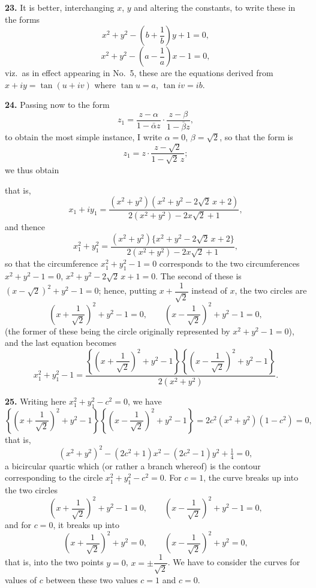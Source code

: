 \documentclass[11pt,a4paper]{article}
\begin{document}
\textbf{23.} It is better, interchanging $x$, $y$ and altering the constants, to write these in the forms
\[
x^2 + y^2 - \left(b + \frac{1}{b}\right) y + 1 = 0,
\]
\[
x^2 + y^2 - \left(a - \frac{1}{a}\right) x - 1 = 0,
\]
viz.\ as in effect appearing in No.~5, these are the equations derived from $x + iy = \tan(u + iv)$ where $\tan u = a$, $\tan iv = ib$.

\textbf{24.} Passing now to the form
\[
z_1 = \frac{z - \alpha}{1 - \bar{\alpha}z} \cdot \frac{z - \beta}{1 - \bar{\beta}z},
\]
to obtain the most simple instance, I write $\alpha = 0$, $\beta = \sqrt{2}$, so that the form is
\[
z_1 = z \cdot \frac{z - \sqrt{2}}{1 - \sqrt{2}\,z};
\]
we thus obtain

that is,
\[
x_1 + i y_1 = \frac{(x^2 + y^2)(x^2 + y^2 - 2\sqrt{2}\,x + 2)}{2(x^2 + y^2) - 2x\sqrt{2} + 1},
\]
and thence
\[
x_1^2 + y_1^2 = \frac{(x^2 + y^2)\{x^2 + y^2 - 2\sqrt{2}\,x + 2\}}{2(x^2 + y^2) - 2x\sqrt{2} + 1},
\]
so that the circumference $x_1^2 + y_1^2 - 1 = 0$ corresponds to the two circumferences $x^2 + y^2 - 1 = 0$, $x^2 + y^2 - 2\sqrt{2}\,x + 1 = 0$. The second of these is $(x - \sqrt{2})^2 + y^2 - 1 = 0$; hence, putting $x + \dfrac{1}{\sqrt{2}}$ instead of $x$, the two circles are
\[
\left(x + \frac{1}{\sqrt{2}}\right)^2 + y^2 - 1 = 0, \qquad \left(x - \frac{1}{\sqrt{2}}\right)^2 + y^2 - 1 = 0,
\]
(the former of these being the circle originally represented by $x^2 + y^2 - 1 = 0$), and the last equation becomes
\[
x_1^2 + y_1^2 - 1 = \frac{\left\{\left(x + \dfrac{1}{\sqrt{2}}\right)^2 + y^2 - 1\right\}\left\{\left(x - \dfrac{1}{\sqrt{2}}\right)^2 + y^2 - 1\right\}}{2(x^2 + y^2)}.
\]

\textbf{25.} Writing here $x_1^2 + y_1^2 - c^2 = 0$, we have
\[
\left\{\left(x + \frac{1}{\sqrt{2}}\right)^2 + y^2 - 1\right\}\left\{\left(x - \frac{1}{\sqrt{2}}\right)^2 + y^2 - 1\right\} = 2c^2 (x^2 + y^2)(1 - c^2) = 0,
\]
that is,
\[
(x^2 + y^2)^2 - (2c^2 + 1)x^2 - (2c^2 - 1)y^2 + \tfrac{1}{4} = 0,
\]
a bicircular quartic which (or rather a branch whereof) is the contour corresponding to the circle $x_1^2 + y_1^2 - c^2 = 0$. For $c = 1$, the curve breaks up into the two circles
\[
\left(x + \frac{1}{\sqrt{2}}\right)^2 + y^2 - 1 = 0, \qquad \left(x - \frac{1}{\sqrt{2}}\right)^2 + y^2 - 1 = 0,
\]
and for $c = 0$, it breaks up into
\[
\left(x + \frac{1}{\sqrt{2}}\right)^2 + y^2 = 0, \qquad \left(x - \frac{1}{\sqrt{2}}\right)^2 + y^2 = 0,
\]
that is, into the two points $y = 0$, $x = \pm \dfrac{1}{\sqrt{2}}$. We have to consider the curves for values of $c$ between these two values $c = 1$ and $c = 0$.
\end{document}
